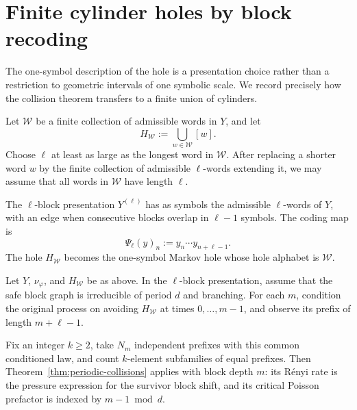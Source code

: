 \section{Finite cylinder holes by block recoding}
\label{sec:block-recoding}

The one-symbol description of the hole is a presentation choice rather
than a restriction to geometric intervals of one symbolic scale.  We
record precisely how the collision theorem transfers to a finite union
of cylinders.

Let \(\mathcal W\) be a finite collection of admissible words in \(Y\),
and let
\[
  H_{\mathcal W}:=\bigcup_{w\in\mathcal W}[w].
\]
Choose \(\ell\) at least as large as the longest word in
\(\mathcal W\).  After replacing a shorter word \(w\) by the finite
collection of admissible \(\ell\)-words extending it, we may assume that
all words in \(\mathcal W\) have length \(\ell\).

The \(\ell\)-block presentation \(Y^{(\ell)}\) has as symbols the
admissible \(\ell\)-words of \(Y\), with an edge when consecutive blocks
overlap in \(\ell-1\) symbols.  The coding map is
\[
  \Psi_\ell(y)_n:=y_n\cdots y_{n+\ell-1}.
\]
The hole \(H_{\mathcal W}\) becomes the one-symbol Markov hole whose
hole alphabet is \(\mathcal W\).

\begin{proposition}
\label{prop:cylinder-hole-recoding}
Let \(Y\), \(\nu_\varphi\), and \(H_{\mathcal W}\) be as above.  In
the \(\ell\)-block presentation, assume that the safe block graph is
irreducible of period \(d\) and branching.  For each \(m\), condition
the original process on avoiding \(H_{\mathcal W}\) at times
\(0,\ldots,m-1\), and observe its prefix of length \(m+\ell-1\).

Fix an integer \(k\geq2\), take \(N_m\) independent prefixes with this
common conditioned law, and count \(k\)-element subfamilies of equal
prefixes.  Then Theorem~\ref{thm:periodic-collisions} applies with block
depth \(m\): its R\'enyi rate is the pressure expression for the
survivor block shift, and its critical Poisson prefactor is indexed by
\(m-1\bmod d\).
\end{proposition}

